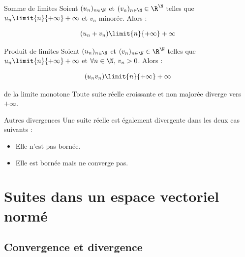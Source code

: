\begin{theorement}{Somme de limites}{}
    Soient $(u_n)_{n \in \N}$ et $(v_n)_{n \in \N} \in \R^{\N}$ telles que 
    $u_n \limit{n}{+\infty} +\infty$ et $v_n$ minorée. Alors :

    $$ (u_n + v_n) \limit{n}{+\infty} +\infty $$
\end{theorement}

\begin{theorement}{Produit de limites}{}
    Soient $(u_n)_{n \in \N}$ et $(v_n)_{n \in \N} \in \R^{\N}$ telles que
    $u_n \limit{n}{+\infty} +\infty$ et $\forall n \in \N, \, v_n > 0$. Alors :

    $$ (u_n v_n) \limit{n}{+\infty} +\infty $$
    
\end{theorement}

\begin{theorement}{de la limite monotone}{}
    Toute suite réelle croissante et non majorée diverge vers $+\infty$.
\end{theorement}

\begin{definitionnt}{Autres divergences}{}
    Une suite réelle est également divergente dans les deux cas suivants : 
    \begin{itemize}
        \item Elle n'est pas bornée. 
        \item Elle est bornée mais ne converge pas.
    \end{itemize}
\end{definitionnt}

\section{Suites dans un espace vectoriel normé}
\subsection{Convergence et divergence}

